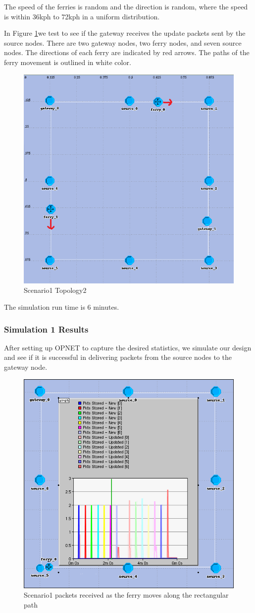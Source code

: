 The speed of the ferries is random and the direction is random, where the speed is within 36kph to 72kph in a uniform distribution.  

In Figure \ref{fig:scenario1}we test to see if the gateway receives the update packets sent by the source nodes.  
There are two gateway nodes, two ferry nodes, and seven source nodes.  
The directions of each ferry are indicated by red arrows.
The paths of the ferry movement is outlined in white color.

\begin{figure}[h]
    \centering
    \includegraphics[width=.7\textwidth]{images/scenario1-top2}
    \caption{Scenario1 Topology2}
    \label{fig:scenario1}
\end{figure}

The simulation run time is 6 minutes.  

\subsubsection{Simulation 1 Results}

After setting up OPNET to capture the desired statistics, we simulate our design and see if it is successful in delivering packets from the source nodes to the gateway node.

\begin{figure}[h]
    \centering
    \includegraphics[width=.5\textwidth]{images/scenario1-result-received}
    \caption{Scenario1 packets received as the ferry moves along the rectangular path}
    \label{fig:result1-a}
\end{figure}

